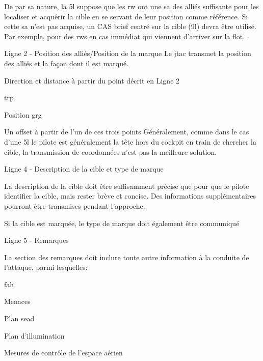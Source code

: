 \e
	\item De par sa nature, la \gls{5l} suppose que les \gls{rw} ont une \gls{sa} des alliés suffisante pour les localiser et acquérir la cible en se servant de leur position comme référence. Si cette \gls{sa} n'est pas acquise, un CAS brief centré sur la cible (\gls{9l}) devra être utilisé. Par exemple, pour des \glspl{rw} en \gls{cas} immédiat qui viennent d'arriver sur la \gls{flot}.
	\ee
		.
		\item{Ligne 2 - Position des alliés/Position de la marque}{
		Le \gls{jtac} transmet la position des alliés et la façon dont il est marqué.}
		\eee
			\item Direction et distance à partir du point décrit en Ligne 2
			\item \gls{trp}
			\item Position \gls{grg}
			\item Un offset à partir de l'un de ces trois points
		\ed
		Généralement, comme dans le cas d'une \gls{5l} le pilote est généralement la tête hors du cockpit en train de chercher la cible, la transmission de coordonnées n'est pas la meilleure solution.
		\item Ligne 4 - Description de la cible et type de marque
		\eee
			\item La description de la cible doit être suffisamment précise que pour que le pilote identifier la cible, mais rester brève et concise. Des informations supplémentaires pourront être transmises pendant l'approche.
			\item Si la cible est marquée, le type de marque doit également être communiqué
		\ed
		\item Ligne 5 - Remarques
		\eee
			\item La section des remarques doit inclure toute autre information à la conduite de l'attaque, parmi lesquelles:
			\eeee
				\item \gls{fah}
				\item Menaces
				\item Plan \gls{sead}
				\item Plan d'illumination
				\item Mesures de contrôle de l'espace aérien
